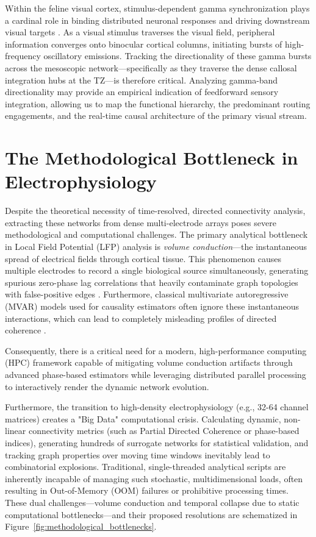 Within the feline visual cortex, stimulus-dependent gamma synchronization plays a cardinal role in binding distributed neuronal responses and driving downstream visual targets \cite{neuenschwander2023}. As a visual stimulus traverses the visual field, peripheral information converges onto binocular cortical columns, initiating bursts of high-frequency oscillatory emissions. Tracking the directionality of these gamma bursts across the mesoscopic network—specifically as they traverse the dense callosal integration hubs at the TZ—is therefore critical. Analyzing gamma-band directionality may provide an empirical indication of feedforward sensory integration, allowing us to map the functional hierarchy, the predominant routing engagements, and the real-time causal architecture of the primary visual stream.

\section{The Methodological Bottleneck in Electrophysiology}

Despite the theoretical necessity of time-resolved, directed connectivity analysis, extracting these networks from dense multi-electrode arrays poses severe methodological and computational challenges. The primary analytical bottleneck in Local Field Potential (LFP) analysis is \textit{volume conduction}—the instantaneous spread of electrical fields through cortical tissue. This phenomenon causes multiple electrodes to record a single biological source simultaneously, generating spurious zero-phase lag correlations that heavily contaminate graph topologies with false-positive edges \cite{bastos2015}. Furthermore, classical multivariate autoregressive (MVAR) models used for causality estimators often ignore these instantaneous interactions, which can lead to completely misleading profiles of directed coherence \cite{Faes_2010}.

Consequently, there is a critical need for a modern, high-performance computing (HPC) framework capable of mitigating volume conduction artifacts through advanced phase-based estimators while leveraging distributed parallel processing to interactively render the dynamic network evolution.

Furthermore, the transition to high-density electrophysiology (e.g., 32-64 channel matrices) creates a "Big Data" computational crisis. Calculating dynamic, non-linear connectivity metrics (such as Partial Directed Coherence or phase-based indices), generating hundreds of surrogate networks for statistical validation, and tracking graph properties over moving time windows inevitably lead to combinatorial explosions. Traditional, single-threaded analytical scripts are inherently incapable of managing such stochastic, multidimensional loads, often resulting in Out-of-Memory (OOM) failures or prohibitive processing times. These dual challenges---volume conduction and temporal collapse due to static computational bottlenecks---and their proposed resolutions are schematized in Figure~\ref{fig:methodological_bottlenecks}.

